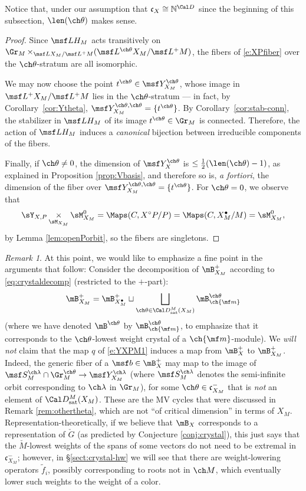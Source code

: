 \documentclass[final]{amsart}
\theoremstyle{remark}
\newtheorem{rem}[subsubsection]{Remark}
\theoremstyle{definition}
\DeclareMathOperator*{\xt}{\times}
\numberwithin{equation}{section}
\begin{document}
Notice that, under our assumption that $\mathfrak c_X \cong 
\mathbb N^{\Cal D}$ since the beginning of this subsection, $\len(\ch\theta)$ makes sense.
\begin{proof}
Since $\msf LH_M$ acts transitively on 
$\Gr_M \xt_{\msf L X_M / \msf L^+M} (\msf L^{\ch\theta} X_M / \msf L^+M)$,
the fibers of \eqref{e:XPfiber} over the $\ch\theta$-stratum are all isomorphic. 

We may now choose the point $t^{\ch\theta}\in \msf Y_{X_M}^{\ch\theta}$, whose image in $\msf L^+ X_M / \msf L^+M$ lies in the $\ch\theta$-stratum --- in fact, by Corollary~\ref{cor:Ytheta}, $\msf Y_{X_M}^{\ch\theta,\ch\theta} = \{ t^{\ch\theta}\}$. By Corollary~\ref{cor:stab-conn}, the stabilizer in $\msf L H_M$ of its image 
$t^{\ch\theta}\in \Gr_M$
is connected. Therefore, the action of $\msf L H_M$ induces a \emph{canonical} bijection between irreducible components of the fibers.

Finally, if $\ch\theta\ne 0$, the dimension of $\msf Y^{\ch\theta}_X$ is $\le \frac 1 2 (\len(\ch\theta)-1)$, as explained in Proposition \ref{prop:Vbasis}, and therefore so is, \emph{a fortiori}, the dimension of the fiber over $\msf Y_{X_M}^{\ch\theta,\ch\theta} = \{ t^{\ch\theta}\}$. For $\ch\theta =0$, we observe that 
\[ \sY_{X,P} \xt_{\sM_{X_M}}     \sM_{X_M}^0 = \Maps(C, X^\circ P/P) = \Maps(C, X_M^\bullet /M) =  \sM_{X_M}^0,\]
by Lemma \ref{lem:openPorbit}, so the fibers are singletons.
\end{proof}

\begin{rem}
At this point, we would like to emphasize a fine point in the arguments that follow: Consider the decomposition of $\mB_{X_M}^+$ according to \eqref{eq:crystaldecomp} (restricted to the $+$-part):
\[\mB_{X_M}^+ =  \mB_{X_M^\bullet}^+ \sqcup \bigsqcup_{\ch\theta \in \Cal D^M_{\mathrm{sat}}(X_M)} \mB^{\ch\theta}_{\ch{\mf m}}\]
(where we have denoted $\mB^{\ch\theta}$ by $\mB^{\ch\theta}_{\ch{\mf m}}$, to emphasize that it corresponds to the $\ch\theta$-lowest weight crystal of a $\ch{\mf m}$-module). We \emph{will not} claim that the map $q$ of \eqref{e:YXPM1} induces a map from $\mB_X^+$ to $\mB_{X_M}^+$. Indeed, the generic fiber of a $\msf b\in \mB_X^+$ may map to the image of $\msf S_M^{\ch\lambda} \cap \Gr_M^{\ch\theta} \to \msf Y_{X_M}^{\ch\lambda}$ (where $\msf S_M^{\ch\lambda}$ denotes the semi-infinite orbit corresponding to $\ch\lambda$ in $\Gr_M$), for some $\ch\theta \in \mathfrak c_{X_M}^-$ that is \emph{not} an element of $\Cal D^M_{\mathrm{sat}}(X_M)$. These are the MV cycles that were discussed in Remark \ref{rem:othertheta}, which are not ``of critical dimension'' in terms of $X_M$. 
Representation-theoretically, if we believe that $\mB_X$ corresponds to a representation of $\check G$ (as predicted by Conjecture \ref{conj:crystal}), this just says that the $\check M$-lowest weights of the spans of some vectors do not need to be extremal in $\mathfrak c_{X_M}^-$; however, in \S \ref{sect:crystal-hw} we will see that there are weight-lowering operators $\tilde f_i$, possibly corresponding to roots not in $\ch M$, which eventually lower such weights to the weight of a color.
\end{rem}
\end{document}
